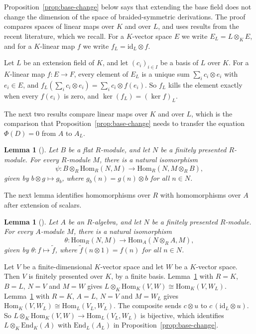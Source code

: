 \documentclass[]{interact}
\theoremstyle{plain}
\newtheorem{lemma}[theorem]{Lemma}
\theoremstyle{definition}
\theoremstyle{remark}
\begin{document}
Proposition~\ref{prop:base-change} below says that extending the base field does not change the dimension of the space of braided-symmetric derivations. The proof compares spaces of linear maps over $K$ and over $L$, and uses results from the recent literature, which we recall. %
For a $K$-vector space $E$ we write $E_L = L \otimes_K E$, and for a $K$-linear map $f$ we write $f_L = \mathrm{id}_L \otimes f$.

Let $L$ be an extension field of $K$, and let $(c_i)_{i \in I}$ be a basis of $L$ over $K$.
For a $K$-linear map $f \colon E \to F$, every element of $E_L$ is a unique sum $\sum_i c_i \otimes e_i$ with $e_i \in E$, and $f_L(\sum_i c_i \otimes e_i) = \sum_i c_i \otimes f(e_i)$.
So $f_L$ kills the element exactly when every $f(e_i)$ is zero, and $\ker(f_L) = (\ker f)_L$.

The next two results compare linear maps over $K$ and over $L$, which is the comparison that Proposition~\ref{prop:base-change} needs to transfer the equation $\Phi(D) = 0$ from $A$ to $A_L$. %

\begin{lemma}[{\cite[Lemma 4.86]{Rotman2009}}]\label{lem:rotman-486}
Let $B$ be a flat $R$-module, and let $N$ be a finitely presented $R$-module.
For every $R$-module $M$, there is a natural isomorphism
\[
\psi \colon B \otimes_R \mathrm{Hom}_R(N, M) \to \mathrm{Hom}_R(N, M \otimes_R B),
\]
given by $b \otimes g \mapsto g_b$, where $g_b(n) = g(n) \otimes b$ for all $n \in N$.
\end{lemma}

The next lemma identifies homomorphisms over $R$ with homomorphisms over $A$ after extension of scalars. %

\begin{lemma}[{\cite[Lemma 4.85]{Rotman2009}}]\label{lem:rotman-485}
Let $A$ be an $R$-algebra, and let $N$ be a finitely presented $R$-module.
For every $A$-module $M$, there is a natural isomorphism
\[
\theta \colon \mathrm{Hom}_R(N, M) \to \mathrm{Hom}_A(N \otimes_R A, M),
\]
given by $\theta \colon f \mapsto \tilde f$, where $\tilde f(n \otimes 1) = f(n)$ for all $n \in N$.
\end{lemma}

Let $V$ be a finite-dimensional $K$-vector space and let $W$ be a $K$-vector space.
Then $V$ is finitely presented over $K$, by a finite basis. %
Lemma~\ref{lem:rotman-486} with $R = K$, $B = L$, $N = V$ and $M = W$ gives $L \otimes_K \mathrm{Hom}_K(V, W) \cong \mathrm{Hom}_K(V, W_L)$.
Lemma~\ref{lem:rotman-485} with $R = K$, $A = L$, $N = V$ and $M = W_L$ gives $\mathrm{Hom}_K(V, W_L) \cong \mathrm{Hom}_L(V_L, W_L)$.
The composite sends $c \otimes u$ to $c\,(\mathrm{id}_L \otimes u)$. %
So $L \otimes_K \mathrm{Hom}_K(V, W) \to \mathrm{Hom}_L(V_L, W_L)$ is bijective, which identifies $L \otimes_K \mathrm{End}_K(A)$ with $\mathrm{End}_L(A_L)$ in Proposition~\ref{prop:base-change}. %
\end{document}
